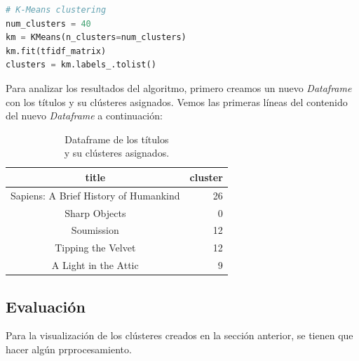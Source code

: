 \documentclass{uimppracticas}
\begin{document}
\begin{lstlisting}[language=python]
# K-Means clustering
num_clusters = 40
km = KMeans(n_clusters=num_clusters)
km.fit(tfidf_matrix)
clusters = km.labels_.tolist()
\end{lstlisting}

Para analizar los resultados del algoritmo, primero creamos un nuevo \textit{Dataframe} con los títulos y su clústeres asignados. Vemos las primeras líneas del contenido del nuevo \textit{Dataframe} a continuación:

\begin{table}[h]
	\centering
	\begin{tabular}{cr}
		\toprule
		title &  cluster \\
		\midrule
		Sapiens: A Brief History of Humankind & 26 \\
		Sharp Objects & 0 \\
		Soumission & 12 \\
		Tipping the Velvet & 12 \\
		A Light in the Attic & 9 \\
		\bottomrule
	\end{tabular}
	\caption{Dataframe de los títulos \\ y su clústeres asignados.}
	\label{table2}
\end{table}


\subsection{Evaluación}


Para la visualización de los clústeres creados en la sección anterior, se tienen que hacer algún prprocesamiento.
\renewcommand{\refname}{Bibliografía}


\end{document}
